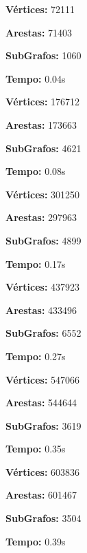 \documentclass[12pt]{article}
\begin{document}
\begin{multicols}{2}
    \textbf{Vértices:} 72111\par
    \textbf{Arestas:} 71403\par
    \textbf{SubGrafos:} 1060\par
    \textbf{Tempo:} 0.04s\par
    
    \vspace{1em}
    
    \textbf{Vértices:} 176712\par
    \textbf{Arestas:} 173663\par
    \textbf{SubGrafos:} 4621\par
    \textbf{Tempo:} 0.08s\par

    \vspace{1em}

    \textbf{Vértices:} 301250\par
    \textbf{Arestas:} 297963\par
    \textbf{SubGrafos:} 4899\par
    \textbf{Tempo:} 0.17s\par

    \vspace{1em}

    \textbf{Vértices:} 437923\par
    \textbf{Arestas:} 433496\par
    \textbf{SubGrafos:} 6552\par
    \textbf{Tempo:} 0.27s\par

    \vspace{1em}

    \textbf{Vértices:} 547066\par
    \textbf{Arestas:} 544644\par
    \textbf{SubGrafos:} 3619\par
    \textbf{Tempo:} 0.35s\par

    \vspace{1em}

    \textbf{Vértices:} 603836\par
    \textbf{Arestas:} 601467\par
    \textbf{SubGrafos:} 3504\par
    \textbf{Tempo:} 0.39s\par
\end{multicols}

\end{document}
